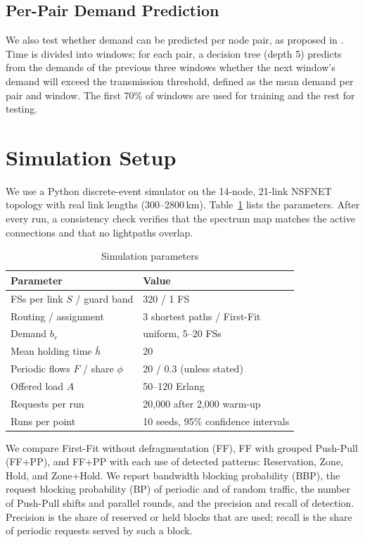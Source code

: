 \documentclass[conference]{IEEEtran}
\begin{document}
\subsection{Per-Pair Demand Prediction}
We also test whether demand can be predicted per node pair, as proposed in \cite{malayeri2022}. Time is divided into windows; for each pair, a decision tree (depth 5) predicts from the demands of the previous three windows whether the next window's demand will exceed the transmission threshold, defined as the mean demand per pair and window. The first 70\% of windows are used for training and the rest for testing.

\section{Simulation Setup}\label{sec:setup}
We use a Python discrete-event simulator on the 14-node, 21-link NSFNET topology with real link lengths (300--2800\,km). Table~\ref{tab:params} lists the parameters. After every run, a consistency check verifies that the spectrum map matches the active connections and that no lightpaths overlap.

\begin{table}[t]
\centering
\caption{Simulation parameters}
\label{tab:params}
\small
\begin{tabular}{@{}ll@{}}
\toprule
Parameter & Value \\
\midrule
FSs per link $S$ / guard band & 320 / 1 FS \\
Routing / assignment & 3 shortest paths / First-Fit \\
Demand $b_r$ & uniform, 5--20 FSs \\
Mean holding time $\bar{h}$ & 20 \\
Periodic flows $F$ / share $\phi$ & 20 / 0.3 (unless stated) \\
Offered load $A$ & 50--120 Erlang \\
Requests per run & 20{,}000 after 2{,}000 warm-up \\
Runs per point & 10 seeds, 95\% confidence intervals \\
\bottomrule
\end{tabular}
\end{table}

We compare First-Fit without defragmentation (FF), FF with grouped Push-Pull (FF+PP), and FF+PP with each use of detected patterns: Reservation, Zone, Hold, and Zone+Hold. We report bandwidth blocking probability (BBP), the request blocking probability (BP) of periodic and of random traffic, the number of Push-Pull shifts and parallel rounds, and the precision and recall of detection. Precision is the share of reserved or held blocks that are used; recall is the share of periodic requests served by such a block.
\end{document}
